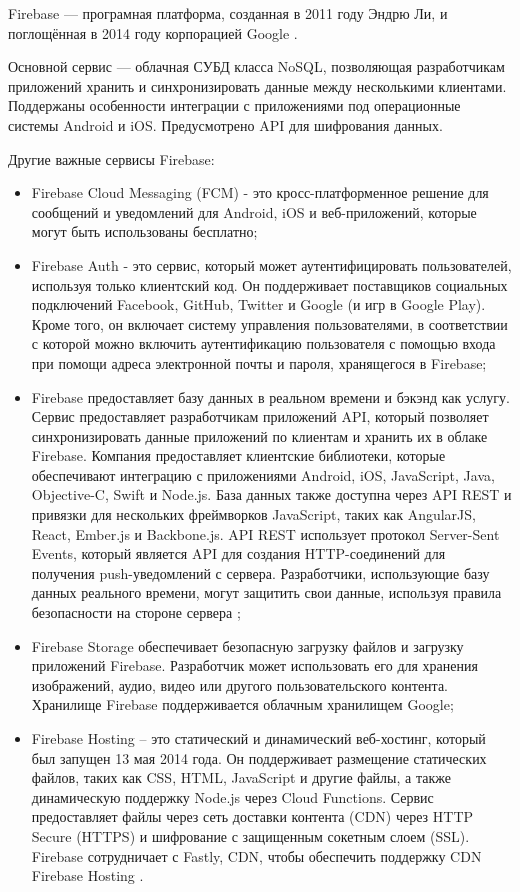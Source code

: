 Firebase — програмная платформа, созданная в 2011 году Эндрю Ли, и поглощённая в 2014 году корпорацией Google \cite{firebase_doc}.

Основной сервис — облачная СУБД класса NoSQL, позволяющая разработчикам приложений хранить и синхронизировать данные между несколькими клиентами. Поддержаны особенности интеграции с приложениями под операционные системы Android и iOS. \newline Предусмотрено API для шифрования данных.

Другие важные сервисы Firebase:

\begin{itemize}
	\item Firebase Cloud Messaging (FCM) - это кросс-платформенное решение для сообщений и уведомлений для Android, iOS и веб-приложений, которые могут быть использованы бесплатно;
	\item Firebase Auth - это сервис, который может аутентифицировать пользователей, используя только клиентский код. Он поддерживает поставщиков социальных подключений Facebook, GitHub, Twitter и Google (и игр в Google Play). Кроме того, он включает систему управления пользователями, в соответствии с которой можно включить аутентификацию пользователя с помощью входа при помощи адреса электронной почты и пароля, хранящегося в Firebase;
	\item Firebase предоставляет базу данных в реальном времени и бэкэнд как услугу. Сервис предоставляет разработчикам приложений API, который позволяет синхронизировать данные приложений по клиентам и хранить их в облаке Firebase. Компания предоставляет клиентские библиотеки, которые обеспечивают интеграцию с приложениями Android, iOS, JavaScript, Java, Objective-C, Swift и Node.js. База данных также доступна через API REST и привязки для нескольких фреймворков JavaScript, таких как AngularJS, React, Ember.js и Backbone.js. API REST использует протокол Server-Sent Events, который является API для создания HTTP-соединений для получения push-уведомлений с сервера. Разработчики, использующие базу данных реального времени, могут защитить свои данные, используя правила безопасности на стороне сервера \cite{firebase_database};
	\item Firebase Storage обеспечивает безопасную загрузку файлов и загрузку приложений Firebase. Разработчик может использовать его для хранения изображений, аудио, видео или другого пользовательского контента. Хранилище Firebase поддерживается облачным хранилищем Google;
	\item Firebase Hosting – это статический и динамический веб-хостинг, который был запущен 13 мая 2014 года. Он поддерживает размещение статических файлов, таких как CSS, HTML, JavaScript и другие файлы, а также динамическую поддержку Node.js через Cloud Functions. Сервис предоставляет файлы через сеть доставки контента (CDN) через HTTP Secure (HTTPS) и шифрование с защищенным сокетным слоем (SSL). Firebase сотрудничает с Fastly, CDN, чтобы обеспечить поддержку CDN Firebase Hosting \cite{firebase_hosting}.
\end{itemize}

